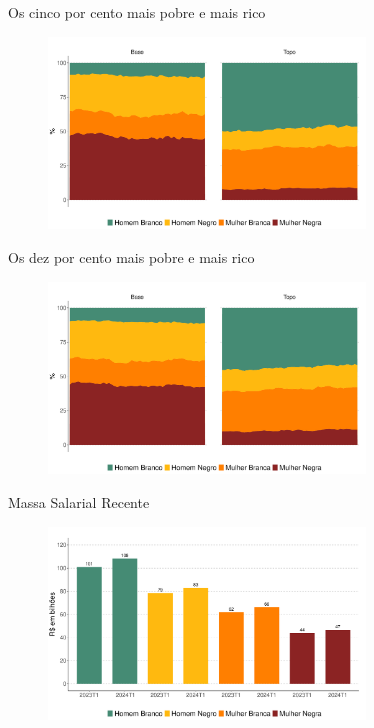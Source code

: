 \documentclass[10pt, xcolor=x11names,compress]{beamer}
\begin{document}
		\begin{frame}{Os cinco por cento mais pobre e mais rico}
		\begin{figure}
			\centering
			\includegraphics[width = 0.75\textwidth]{figures_output/base_topo_5.pdf}
		\end{figure}
	\end{frame}
	
		\begin{frame}{Os dez por cento mais pobre e mais rico}
		\begin{figure}
			\centering
			\includegraphics[width = 0.75\textwidth]{figures_output/base_topo_10.pdf}
		\end{figure}
	\end{frame}
	
	\begin{frame}{Massa Salarial Recente}
		\begin{figure}
			\centering
			\includegraphics[width = 0.75\textwidth]{figures_output/massa_habitual.pdf}
		\end{figure}
	\end{frame}
	
\end{document}
